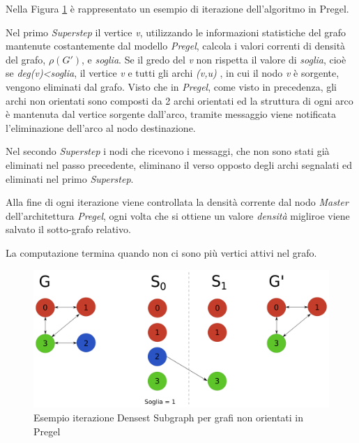 \documentclass[LaM,binding=0.6cm]{sapthesis}
\begin{document}
Nella Figura \ref{fig:PREGELDENSESETU} è rappresentato un esempio di iterazione dell'algoritmo in Pregel.

Nel primo \textit{Superstep} il vertice \textit{v}, utilizzando le informazioni statistiche del grafo mantenute costantemente dal modello \textit{Pregel}, calcola i valori correnti di densità del grafo, $\rho(G')$, e \textit{soglia}. Se il gredo del \textit{v} non rispetta il valore di \textit{soglia}, cioè se \textit{deg(v)<soglia}, il vertice \textit{v} e tutti gli archi \textit{(v,u)} , in cui il nodo \textit{v} è sorgente, vengono eliminati dal grafo. 
Visto che in \textit{Pregel}, come visto in precedenza, gli archi non orientati sono composti da 2 archi orientati ed la struttura di ogni arco è mantenuta dal vertice sorgente dall'arco, tramite messaggio viene notificata l'eliminazione dell'arco al nodo destinazione.
  
Nel secondo \textit{Superstep} i nodi che ricevono i messaggi, che non sono stati già eliminati nel passo precedente, eliminano il verso opposto degli archi segnalati ed eliminati nel primo \textit{Superstep}.

Alla fine di ogni iterazione viene controllata la densità corrente dal nodo \textit{Master} dell'architettura \textit{Pregel}, ogni volta che si ottiene un valore \textit{densità} migliroe viene salvato il sotto-grafo relativo. 

La computazione termina quando non ci sono più vertici attivi nel grafo.

\begin{minipage}{\linewidth}

\end{minipage}


\begin{figure}
\centering
 \includegraphics[width=1\textwidth]{PREGEL-denesestU}
\caption{Esempio iterazione Densest Subgraph per grafi non orientati in Pregel}
\label{fig:PREGELDENSESETU}
\end{figure}
\end{document}
